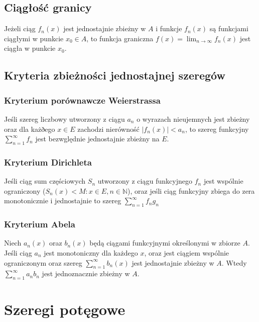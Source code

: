 \documentclass{../notatki}
\begin{document}
\subsection{Ciągłość granicy}

Jeżeli ciąg $f_n(x)$ jest jednostajnie zbieżny w $A$ i funkcje $f_n(x)$ są
funkcjami ciągłymi w punkcie $x_0 \in A$, to funkcja graniczna $f(x)
= \lim_{n \to \infty} f_n(x)$ jest ciągła w punkcie $x_0$.

\subsection{Kryteria zbieżności jednostajnej szeregów}

\subsubsection{Kryterium porównawcze Weierstrassa}

Jeśli szereg liczbowy utworzony z ciągu $a_n$ o wyrazach nieujemnych jest
zbieżny oraz dla każðego $x \in E$ zachodzi nierówność $|f_n(x)| < a_n$, to
szereg funkcyjny $\sum_{n=1}^\infty f_n$ jest bezwględnie jednostajnie
zbieżny na $E$.

\subsubsection{Kryterium Dirichleta}

Jeśli ciąg sum częściowych $S_n$ utworzony z ciągu funkcyjnego $f_n$ jest
wspólnie ograniczony ($S_n(x) < M : x \in E, n \in \mathbb{N}$), oraz jeśli
ciąg funkcyjny zbiega do zera monotonicznie i jednostajnie to szereg
$\sum_{n=1}^\infty f_n g_n$

\subsubsection{Kryterium Abela}

Niech $a_n(x)$ oraz $b_n(x)$ będą ciągami funkcyjnymi określonymi w zbiorze
$A$. Jeśli ciąg $a_n$ jest monotoniczny dla każdego $x$, oraz jest
ciągiem wspólnie ograniczonym oraz szereg $\sum_{n=1}^\infty b_n(x)$
jest jednostajnie zbieżny w $A$. Wtedy $\sum_{n=1}^{\infty} a_n b_n$ jest
jednoznacznie zbieżny w $A$.

\section{Szeregi potęgowe}
\end{document}
